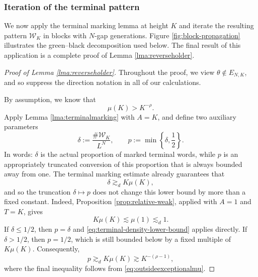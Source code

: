 \documentclass[12pt]{amsart}
\numberwithin{equation}{section}
\begin{document}
\subsubsection{Iteration of the terminal pattern}

We now apply the terminal marking lemma at height $K$ and iterate the
resulting pattern $\mathscr{W}_K$ in blocks with $N$-gap generations.  Figure
\ref{fig:block-propagation} illustrates the green--black decomposition used
below. The final result of this application is a complete proof of Lemma \ref{lma:reverseholder}.

\begin{proof}[Proof of Lemma \ref{lma:reverseholder}]
Throughout the proof, we view $\theta\notin E_{N,K}$, and so suppress the direction
notation in all of our calculations.

By assumption, we know that
\begin{equation}\label{eq:outsideexceptionalmu}
 \mu(K)>K^{-\rho}.
\end{equation}
Apply Lemma \ref{lma:terminalmarking} with $A=K$, and define two auxiliary parameters
\[
 \delta:=\frac{\#\mathscr W_K}{L^N},
 \qquad
 p:=\min\left\{\delta,\frac12\right\}.
\]
In words: $\delta$ is the actual proportion of marked terminal words, while $p$
is an appropriately truncated conversion of this proportion that is always bounded away from one.  The
terminal marking estimate already guarantees that
\begin{equation}\label{eq:terminal-density-lower-bound}
 \delta\gtrsim_d K\mu(K),
\end{equation}
and so the truncation $\delta \mapsto p$ does not change this lower bound by more than a fixed
constant.  Indeed, Proposition \ref{prop:relative-weak}, applied with $A=1$
and $T=K$, gives
\[
 K\mu(K)\lesssim\mu(1)\lesssim_d1.
\]
If $\delta\leq1/2$, then $p=\delta$ and
\eqref{eq:terminal-density-lower-bound} applies directly.  If
$\delta>1/2$, then $p=1/2$, which is still bounded below by a fixed
multiple of $K\mu(K)$.  Consequently,
\begin{equation}\label{eq:conversionproportion}
 p\gtrsim_d K\mu(K)\gtrsim K^{-(\rho-1)},
\end{equation}
where the final inequality follows from \eqref{eq:outsideexceptionalmu}.


\end{proof}
\end{document}
